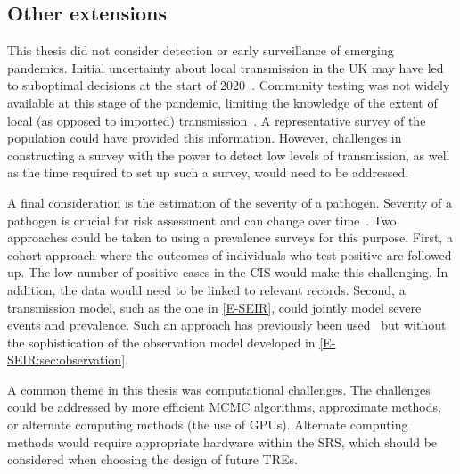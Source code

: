 \documentclass[thesis.tex]{subfiles}
\begin{document}
\subsection{Other extensions}

This thesis did not consider detection or early surveillance of emerging pandemics.
Initial uncertainty about local transmission in the UK may have led to suboptimal decisions at the start of 2020~\autocite{pellisChallenges}.
Community testing was not widely available at this stage of the pandemic, limiting the knowledge of the extent of local (as opposed to imported) transmission~\autocite{whittyTechReportCOVID}.
A representative survey of the population could have provided this information.
However, challenges in constructing a survey with the power to detect low levels of transmission, as well as the time required to set up such a survey, would need to be addressed.

A final consideration is the estimation of the severity of a pathogen.
Severity of a pathogen is crucial for risk assessment and can change over time~\autocite[e.g.][]{kirwanSeverityTrends}.
Two approaches could be taken to using a prevalence surveys for this purpose.
First, a cohort approach where the outcomes of individuals who test positive are followed up.
The low number of positive cases in the CIS would make this challenging.
In addition, the data would need to be linked to relevant records.
Second, a transmission model, such as the one in \cref{E-SEIR}, could jointly model severe events and prevalence.
Such an approach has previously been used~\autocite{daviesAssociation,ironsEstimating,knockKey,nicholsonImproving,pooleyEstimation,birrellRTM2} but without the sophistication of the observation model developed in \cref{E-SEIR:sec:observation}.

A common theme in this thesis was computational challenges.
The challenges could be addressed by more efficient MCMC algorithms, approximate methods, or alternate computing methods (\eg the use of GPUs).
Alternate computing methods would require appropriate hardware within the SRS, which should be considered when choosing the design of future TREs.

\ifSubfilesClassLoaded{
  \listoftodos
}{}
\end{document}
